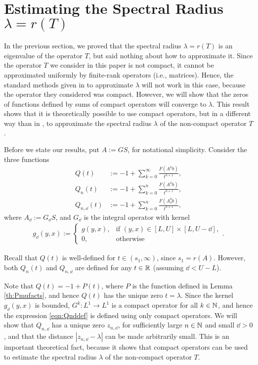 \chapter{Estimating the Spectral Radius $\lambda = r(T)$}

\setcounter{section}{1}

In the previous section, we proved that the spectral radius $\lambda = r(T)$ is an eigenvalue of the operator $T$, but said nothing about how to approximate it. Since the operator $T$ we consider in this paper is not compact, it cannot be approximated uniformly by finite-rank operators (i.e., matrices). Hence, the standard methods given in \cite{Ellner2006} to approximate $\lambda$ will not work in this case, because the operator they considered was compact. However, we will show that the zeros of functions defined by sums of compact operators will converge to $\lambda$. This result shows that it is theoretically possible to use compact operators, but in a different way than in \cite{Ellner2006}, to approximate the spectral radius $\lambda$ of the non-compact operator $T$.

Before we state our results, put $A:=GS$, for notational simplicity. Consider the three functions
\begin{align}
Q(t) &:= -1 + \sum_{k=0}^\infty \frac{F(A^kb)}{t^{k+1}}, \label{eqn:Qdef}\\
Q_n(t) &:= -1 + \sum_{k = 0}^n \frac{F(A^k b)}{t^{k + 1}}, \label{eqn:Qndef} \\
Q_{n, \dd}(t) &:= -1 + \sum_{k = 0}^n \frac{F(A_\dd^k b)}{t^{k + 1}}, \label{eqn:Qnddef}
\end{align}
where $A_\dd := G_\dd S$, and $G_\dd$ is the integral operator with kernel
\begin{align}
	g_\dd(y, x) := \begin{cases} g(y, x), & \text{if } (y, x) \in [L,U] \times [L,U-\dd], \\ 0, & \text{otherwise} \end{cases}. \label{eqn:gdelta}
\end{align}

Recall that $Q(t)$ is well-defined for $t \in (s_1, \infty)$, since $s_1 = r(A)$. However, both $Q_n(t)$ and $Q_{n, \dd}$ are defined for any $t \in \mathbb{R}$ (assuming $\dd < U -L$). 

Note that $Q(t) = -1 + P(t)$, where $P$ is the function defined in Lemma \ref{th:Pmufacts}, and hence $Q(t)$ has the unique zero $t = \lambda$. Since the kernel $g_\dd(y, x)$ is bounded, $G^k:L^1 \to L^1$ is a compact operator for all $k \in \mathbb{N}$, and hence the expression \eqref{eqn:Qnddef} is defined using only compact operators. We will show that $Q_{n, \dd}$ has a unique zero $z_{n, \dd}$, for sufficiently large $n \in \mathbb{N}$ and small $\dd >0$, and that the distance $|z_{n, \dd} - \lambda|$ can be made arbitrarily small. This is an important theoretical fact, because it shows that compact operators can be used to estimate the spectral radius $\lambda$ of the non-compact operator $T$.

